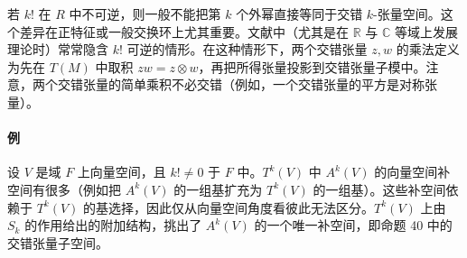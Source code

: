 若 $k!$ 在 $R$ 中不可逆，则一般不能把第 $k$ 个外幂直接等同于交错 $k$-张量空间。这个差异在正特征或一般交换环上尤其重要。文献中（尤其是在 $\mathbb R$ 与 $\mathbb C$ 等域上发展理论时）常常隐含 $k!$ 可逆的情形。在这种情形下，两个交错张量 $z,w$ 的乘法定义为先在 $T(M)$ 中取积 $zw=z\otimes w$，再把所得张量投影到交错张量子模中。注意，两个交错张量的简单乘积不必交错（例如，一个交错张量的平方是对称张量）。

\paragraph{例}
设 $V$ 是域 $F$ 上向量空间，且 $k!\neq0$ 于 $F$ 中。$T^k(V)$ 中 $A^k(V)$ 的向量空间补空间有很多（例如把 $A^k(V)$ 的一组基扩充为 $T^k(V)$ 的一组基）。这些补空间依赖于 $T^k(V)$ 的基选择，因此仅从向量空间角度看彼此无法区分。$T^k(V)$ 上由 $S_k$ 的作用给出的附加结构，挑出了 $A^k(V)$ 的一个唯一补空间，即命题 40 中的交错张量子空间。

